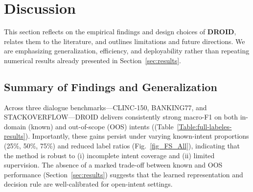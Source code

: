 \documentclass[journal,letterpaper]{IEEEtran}
\begin{document}



\section{Discussion}
\label{sec:discussion}

This section reflects on the empirical findings and design choices of \textbf{DROID}, relates them to the literature, and outlines limitations and future directions. We are emphasizing generalization, efficiency, and deployability rather than repeating numerical results already presented in Section~\ref{sec:results}.

\subsection{Summary of Findings and Generalization}
Across three dialogue benchmarks---\textsc{CLINC-150}, \textsc{BANKING77}, and \textsc{STACKOVERFLOW}---DROID delivers consistently strong macro-F1 on both in-domain (known) and out-of-scope (OOS) intents ((Table~\ref{Table:full-labeles-results}). Importantly, these gains persist under varying known-intent proportions (25\%, 50\%, 75\%) and reduced label ratios (Fig.~\ref{fig_FS_All}), indicating that the method is robust to (i) incomplete intent coverage and (ii) limited supervision. The absence of a marked trade-off between known and OOS performance (Section~\ref{sec:results}) suggests that the learned representation and decision rule are well-calibrated for open-intent settings.
\end{document}
